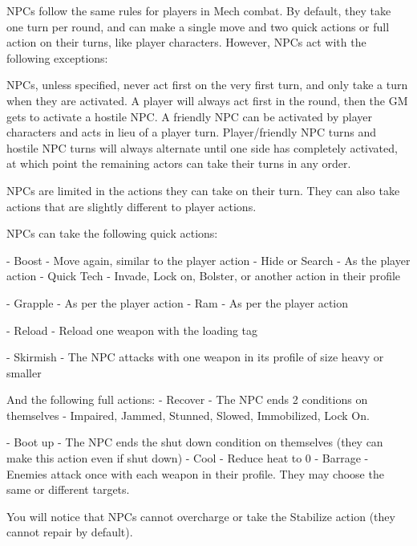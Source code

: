 NPCs follow the same rules for players in Mech combat. By default, they take one turn per  
round, and can make a single move and two quick actions or full action on their turns, like  
player characters. However, NPCs act with the following exceptions:
 

NPCs, unless specified, never act first on the very first turn, and only take a turn when they  
are activated. A player will always act first in the round, then the GM gets to activate a hostile  
NPC. A friendly NPC can be activated by player characters and acts in lieu of a player turn.  
Player/friendly NPC turns and hostile NPC turns will always alternate until one side has  
completely activated, at which point the remaining actors can take their turns in any order.  

                                                                                                         


NPCs are limited in the actions they can take on their turn. They can also take actions that  
are slightly different to player actions.
 
NPCs can take the following quick actions:
 
             -   Boost - Move again, similar to the player action  
             -   Hide or Search - As the player action  
             -   Quick Tech - Invade, Lock on, Bolster, or another action in their profile
 
             -   Grapple - As per the player action  
             -   Ram - As per the player action
 
             -   Reload - Reload one weapon with the loading tag
 
             -   Skirmish - The NPC attacks with one weapon in its profile of size heavy or smaller
 
And the following full actions:  
             -   Recover - The NPC ends 2 conditions on themselves - Impaired, Jammed,  
                 Stunned, Slowed, Immobilized, Lock On.
 
             -   Boot up - The NPC ends the shut down condition on themselves (they can make  
                 this action even if shut down)  
             -   Cool - Reduce heat to 0  
             -   Barrage - Enemies attack once with each weapon in their profile. They may  
                 choose the same or different targets.  

You will notice that NPCs cannot overcharge or take the Stabilize action (they cannot repair by  
default).
 

